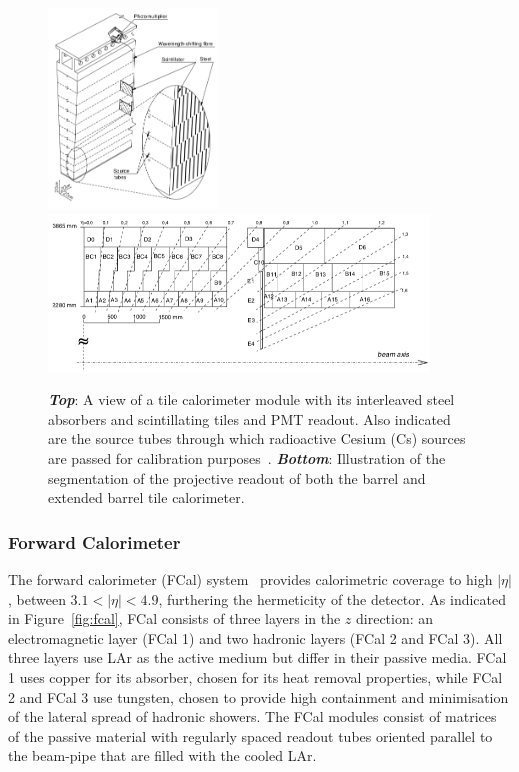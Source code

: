 \begin{figure}[!htb]
    \begin{center}
        \includegraphics[width=0.4\textwidth]{figures/chapter2/calorimeters/atlas_tile_module}
        \includegraphics[width=0.9\textwidth]{figures/chapter2/calorimeters/atlas_tile_plan_view}
        \caption{
            \textbf{\textit{Top}}: A view of a tile calorimeter module with its interleaved steel
                absorbers and scintillating tiles and PMT readout. Also indicated are the source tubes
                through which radioactive Cesium (Cs) sources are passed for calibration purposes~\cite{Marjanovic:2018ohl}.
            \textbf{\textit{Bottom}}: Illustration of the segmentation of the projective readout of
                both the barrel and extended barrel tile calorimeter.
        }
        \label{fig:tile_calo}
    \end{center}
\end{figure}

\FloatBarrier
\subsubsection{Forward Calorimeter}
\label{sec:calo_forward}

The forward calorimeter (FCal) system~\cite{Artamonov_2008} provides calorimetric coverage to
high $\lvert \eta \rvert$, between $3.1 < \lvert \eta \rvert < 4.9$,
furthering the hermeticity of the detector.
As indicated in Figure~\ref{fig:fcal}, FCal consists of three layers in the
$z$ direction: an electromagnetic layer (FCal 1) and two hadronic layers (FCal 2 and FCal 3).
All three layers use LAr as the active medium but differ in their passive media.
FCal 1 uses copper for its absorber, chosen for its heat removal properties,
while FCal 2 and FCal 3 use tungsten, chosen to provide high containment and
minimisation of the lateral spread of hadronic showers.
The FCal modules consist of matrices of the passive material with regularly
spaced readout tubes  oriented parallel to the beam-pipe that are filled with the cooled LAr.

